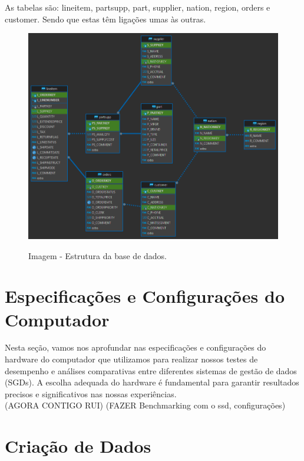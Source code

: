 \documentclass{article}
\begin{document}
As tabelas são: lineitem, partsupp, part, supplier, nation, region, orders e customer. Sendo que estas têm ligações umas às outras.
\begin{figure}[H]
  \centering
  \includegraphics[width=\textwidth]{Graphs/tpchassignment.png}\\
  \caption{Imagem - Estrutura da base de dados.}
  \label{fig:row_import_time}
\end{figure}

\clearpage


\section{Especificações e Configurações do Computador}

\texttt{}\par Nesta seção, vamos nos aprofundar nas especificações e configurações do hardware do computador que utilizamos para realizar nossos testes de desempenho e análises comparativas entre diferentes sistemas de gestão de dados (SGDs). A escolha adequada do hardware é fundamental para garantir resultados precisos e significativos nas nossas experiências.\\

(AGORA CONTIGO RUI) (FAZER Benchmarking com o ssd, configurações)


\section{Criação de Dados}
\end{document}
